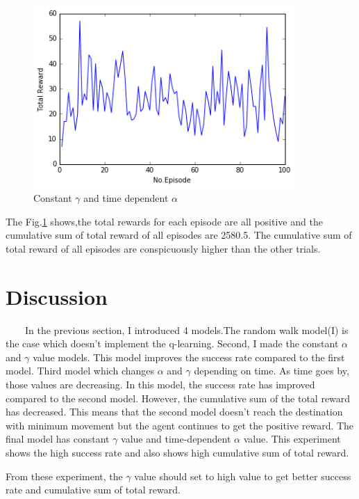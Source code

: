 \documentclass[a4paper,11pt]{article}
\begin{document}
\begin{figure}[H]
\begin{center}
\includegraphics[width=100mm]{graph/gamma_con.jpg}
\end{center}
\caption{ Constant $\gamma$ and time dependent $\alpha$}
\label{fig:four}
\end{figure}

The Fig.\ref{fig:four} shows,the total rewards for each episode are all positive and the cumulative sum of total reward of all episodes are 2580.5.
The cumulative sum of total reward of all episodes are conspicuously higher than the other trials. 

\section{Discussion}
\ \ \ \ In the previous section, I introduced 4 models.The random walk model(I) is the case which doesn't implement the q-learning.
Second, I made the constant $\alpha$ and $\gamma$ value models. This model improves the success rate compared to the first model.
Third model which changes $\alpha$ and $\gamma$  depending on time. As time goes by, those values are decreasing. In this model, the success rate has improved compared to the second model. However, the cumulative sum of the total reward has decreased. This means that the second model doesn't reach the destination with minimum movement but the agent continues to get the positive reward.
The final model has constant $\gamma$ value and time-dependent $\alpha$ value. This experiment shows the high success rate and also shows high cumulative sum of total reward. 

From these experiment, the $\gamma$ value should set to high value to get better success rate and cumulative sum of total reward. 
\end{document}
